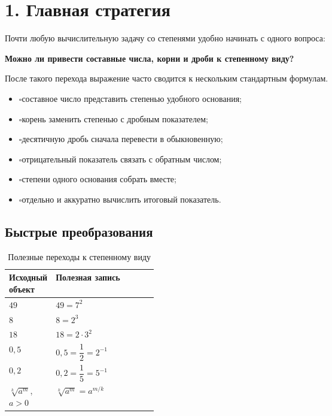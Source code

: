 \documentclass[a4paper,12pt]{article}
\newcommand{\checkitem}{\(\square\)\;}
\newcommand{\important}[1]{\textcolor{darkaccent}{\textbf{#1}}}
\begin{document}
\section{1. Главная стратегия}

Почти любую вычислительную задачу со степенями удобно начинать с одного вопроса:

\begin{center}
\important{Можно ли привести составные числа, корни и дроби к степенному виду?}
\end{center}

После такого перехода выражение часто сводится к нескольким стандартным формулам.

\begin{itemize}
  \item \checkitem составное число представить степенью удобного основания;
  \item \checkitem корень заменить степенью с дробным показателем;
  \item \checkitem десятичную дробь сначала перевести в обыкновенную;
  \item \checkitem отрицательный показатель связать с обратным числом;
  \item \checkitem степени одного основания собрать вместе;
  \item \checkitem отдельно и аккуратно вычислить итоговый показатель.
\end{itemize}

\subsection{Быстрые преобразования}

\renewcommand{\arraystretch}{1.35}
\begin{table}[htbp]
\centering
\caption{Полезные переходы к степенному виду}
\begin{tabularx}{\linewidth}{@{}p{0.29\linewidth}X@{}}
\toprule
\textbf{Исходный объект} & \textbf{Полезная запись} \\
\midrule
\(49\) & \(49=7^2\) \\
\(8\) & \(8=2^3\) \\
\(18\) & \(18=2\cdot 3^2\) \\
\(0{,}5\) & \(0{,}5=\dfrac12=2^{-1}\) \\
\(0{,}2\) & \(0{,}2=\dfrac15=5^{-1}\) \\
\(\sqrt[k]{a^m}\), \(a>0\) &
\(\sqrt[k]{a^m}=a^{m/k}\) \\
\bottomrule
\end{tabularx}
\end{table}
\end{document}
